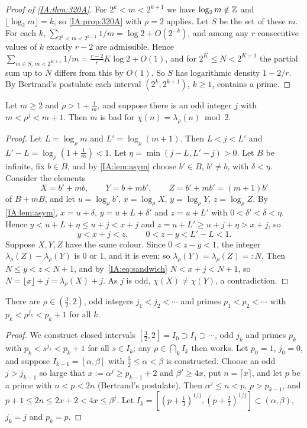 \begin{proof}[Proof of \cref{IA:thm:320A}]
For $2^k<m<2^{k+1}$ we have $\log_2m\notin\mathbb{Z}$ and $\lfloor\log_2m\rfloor=k$, so
\cref{IA:prop:320A} with $\rho=2$ applies. Let $S$ be the set of these $m$. For each $k$,
$\sum_{2^k<m<2^{k+1}}1/m=\log2+O(2^{-k})$, and among any $r$ consecutive values of $k$ exactly $r-2$
are admissible. Hence $\sum_{m\in S,\,m<2^{K+1}}1/m=\frac{r-2}r K\log2+O(1)$, and for $2^K\le
N<2^{K+1}$ the partial sum up to $N$ differs from this by $O(1)$. So $S$ has logarithmic density
$1-2/r$. By Bertrand's postulate each interval $(2^k,2^{k+1})$, $k\ge1$, contains a prime.
\end{proof}

\begin{proposition}\label{IA:prop:320B}
Let $m\ge2$ and $\rho>1+\frac1m$, and suppose there is an odd integer $j$ with $m<\rho^j<m+1$. Then
$m$ is bad for $\chi(n)=\lambda_\rho(n)\bmod2$.
\end{proposition}

\begin{proof}
Let $L=\log_\rho m$ and $L'=\log_\rho(m+1)$. Then $L<j<L'$ and $L'-L=\log_\rho(1+\frac1m)<1$. Let
$\eta=\min(j-L,L'-j)>0$. Let $B$ be infinite, fix $b\in B$, and by \cref{IA:lem:asym} choose $b'\in
B$, $b'\ne b$, with $\delta<\eta$. Consider the elements
\[
X=b'+mb,\qquad Y=b+mb',\qquad Z=b'+mb'=(m+1)b'
\]
of $B+mB$, and let $u=\log_\rho b'$, $x=\log_\rho X$, $y=\log_\rho Y$, $z=\log_\rho Z$. By
\cref{IA:lem:asym}, $x=u+\delta$, $y=u+L+\delta'$ and $z=u+L'$ with $0<\delta'<\delta<\eta$. Hence
$y<u+L+\eta\le u+j<x+j$ and $z=u+L'\ge u+j+\eta>x+j$, so
\begin{equation}\label{IA:eq:sandwich}
y<x+j<z,\qquad 0<z-y<L'-L<1 .
\end{equation}
Suppose $X,Y,Z$ have the same colour. Since $0<z-y<1$, the integer $\lambda_\rho(Z)-\lambda_\rho(Y)$ is
$0$ or $1$, and it is even; so $\lambda_\rho(Y)=\lambda_\rho(Z)=:N$. Then $N\le y<z<N+1$, and
by~\eqref{IA:eq:sandwich} $N<x+j<N+1$, so $N=\lfloor x\rfloor+j=\lambda_\rho(X)+j$. As $j$ is odd,
$\chi(X)\ne\chi(Y)$, a contradiction.
\end{proof}

\begin{lemma}\label{IA:lem:nested}
There are $\rho\in(\frac32,2)$, odd integers $j_1<j_2<\cdots$ and primes $p_1<p_2<\cdots$ with
$p_k<\rho^{j_k}<p_k+1$ for all $k$.
\end{lemma}

\begin{proof}
We construct closed intervals $[\frac32,2]=I_0\supset I_1\supset\cdots$, odd $j_k$ and primes $p_k$
with $p_k<s^{j_k}<p_k+1$ for all $s\in I_k$; any $\rho\in\bigcap_kI_k$ then works. Let $p_0=1$,
$j_0=0$, and suppose $I_{k-1}=[\alpha,\beta]$ with $\frac32\le\alpha<\beta$ is constructed. Choose an
odd $j>j_{k-1}$ so large that $x:=\alpha^j\ge p_{k-1}+2$ and $\beta^j\ge4x$, put $n=\lceil x\rceil$,
and let $p$ be a prime with $n<p<2n$ (Bertrand's postulate). Then $\alpha^j\le n<p$, $p>p_{k-1}$,
and $p+1\le2n\le2x+2<4x\le\beta^j$. Let $I_k=[(p+\frac13)^{1/j},(p+\frac23)^{1/j}]\subset(\alpha,\beta)$,
$j_k=j$ and $p_k=p$.
\end{proof}


